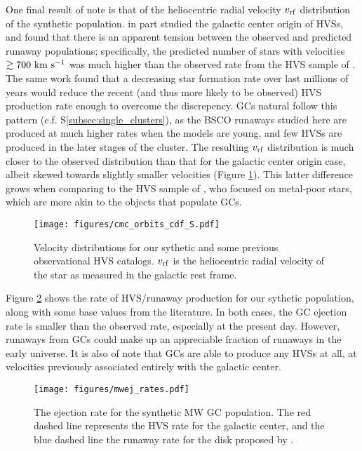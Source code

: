 \documentclass[twocolumn]{aastex631}
\begin{document}
One final result of note is that of the heliocentric radial velocity $v_{\rm rf}$ distribution of the synthetic population.
\citet{2021arXiv211213864G} in part studied the galactic center origin of HVSs, and found that there is an apparent tension between the observed and predicted runaway populations; specifically, the predicted number of stars with velocities $\gtrsim 700~{\rm km~s^{-1}}$ was much higher than the observed rate from the HVS sample of \citet{2018ApJ...866...39B}.
The same work found that a decreasing star formation rate over last millions of years would reduce the recent (and thus more likely to be observed) HVS production rate enough to overcome the discrepency.
GCs natural follow this pattern (c.f. S\ref{subsec:single_clusters}), as the BSCO runaways studied here are produced at much higher rates when the models are young, and few HVSs are produced in the later stages of the cluster.
The resulting $v_{\rm rf}$ distribution is much closer to the observed distribution than that for the galactic center origin case, albeit skewed towards slightly smaller velocities (Figure \ref{fig:cmc_orbits_cdf}).
This latter difference grows when comparing to the HVS sample of \citet{2018ApJ...866..121H}, who focused on metal-poor stars, which are more akin to the objects that populate GCs.

\begin{figure}
    \begin{centering}
        \texttt{[image: figures/cmc\_orbits\_cdf\_S.pdf]}
        \caption{
            Velocity distributions for our sythetic and some previous observational HVS catalogs.
            $v_{\rm rf}$ is the heliocentric radial velocity of the star as measured in the galactic rest frame.
        }
        \label{fig:cmc_orbits_cdf}
    \end{centering}
\end{figure}

Figure \ref{fig:mwej_rates} shows the rate of HVS/runaway production for our sythetic population, along with some base values from the literature.
In both cases, the GC ejection rate is smaller than the observed rate, especially at the present day.
However, runaways from GCs could make up an appreciable fraction of runaways in the early universe.
It is also of note that GCs are able to produce any HVSs at all, at velocities previously associated entirely with the galactic center.

\begin{figure}
    \begin{centering}
        \texttt{[image: figures/mwej\_rates.pdf]}
        \caption{
            The ejection rate for the synthetic MW GC population.
            The red dashed line represents the HVS rate for the galactic center, and the blue dashed line the runaway rate for the disk proposed by \citep{2015ARA&A..53...15B}.
        }
        \label{fig:mwej_rates}
    \end{centering}
\end{figure}
\end{document}
